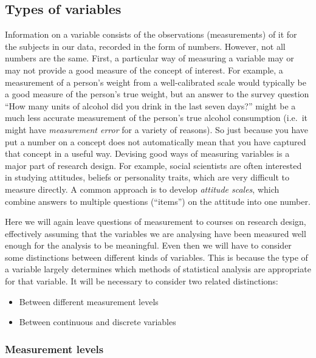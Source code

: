 \documentclass[11pt,a4paper,openany]{book}
\begin{document}
\subsection{Types of variables}\label{ss-intro-def-vartypes}

Information on a variable consists of the observations (measurements) of
it for the subjects in our data, recorded in the form of numbers.
However, not all numbers are the same. First, a particular way of
measuring a variable may or may not provide a good measure of the
concept of interest. For example, a measurement of a person's weight
from a well-calibrated scale would typically be a good measure of the
person's true weight, but an answer to the survey question ``How many
units of alcohol did you drink in the last seven days?'' might be a much
less accurate measurement of the person's true alcohol consumption
(i.e.~it might have \emph{measurement error} for a variety of reasons).
So just because you have put a number on a concept does not
automatically mean that you have captured that concept in a useful way.
Devising good ways of measuring variables is a major part of research
design. For example, social scientists are often interested in studying
attitudes, beliefs or personality traits, which are very difficult to
measure directly. A common approach is to develop \emph{attitude
scales}, which combine answers to multiple questions (``items'') on the
attitude into one number.

Here we will again leave questions of measurement to courses on research
design, effectively assuming that the variables we are analysing have
been measured well enough for the analysis to be meaningful. Even then
we will have to consider some distinctions between different kinds of
variables. This is because the type of a variable largely determines
which methods of statistical analysis are appropriate for that variable.
It will be necessary to consider two related distinctions:

\begin{itemize}
\item
  Between different measurement levels
\item
  Between continuous and discrete variables
\end{itemize}

\subsubsection*{Measurement levels}\label{measurement-levels}
\end{document}
